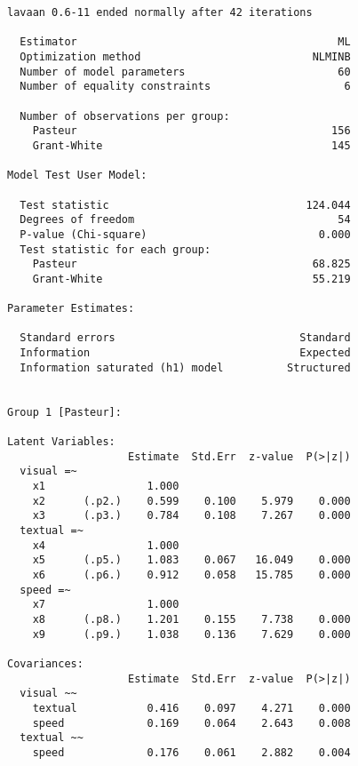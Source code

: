 \begin{verbatim}
lavaan 0.6-11 ended normally after 42 iterations

  Estimator                                         ML
  Optimization method                           NLMINB
  Number of model parameters                        60
  Number of equality constraints                     6
                                                      
  Number of observations per group:                   
    Pasteur                                        156
    Grant-White                                    145
                                                      
Model Test User Model:
                                                      
  Test statistic                               124.044
  Degrees of freedom                                54
  P-value (Chi-square)                           0.000
  Test statistic for each group:
    Pasteur                                     68.825
    Grant-White                                 55.219

Parameter Estimates:

  Standard errors                             Standard
  Information                                 Expected
  Information saturated (h1) model          Structured


Group 1 [Pasteur]:

Latent Variables:
                   Estimate  Std.Err  z-value  P(>|z|)
  visual =~                                           
    x1                1.000                           
    x2      (.p2.)    0.599    0.100    5.979    0.000
    x3      (.p3.)    0.784    0.108    7.267    0.000
  textual =~                                          
    x4                1.000                           
    x5      (.p5.)    1.083    0.067   16.049    0.000
    x6      (.p6.)    0.912    0.058   15.785    0.000
  speed =~                                            
    x7                1.000                           
    x8      (.p8.)    1.201    0.155    7.738    0.000
    x9      (.p9.)    1.038    0.136    7.629    0.000

Covariances:
                   Estimate  Std.Err  z-value  P(>|z|)
  visual ~~                                           
    textual           0.416    0.097    4.271    0.000
    speed             0.169    0.064    2.643    0.008
  textual ~~                                          
    speed             0.176    0.061    2.882    0.004


\end{verbatim}
